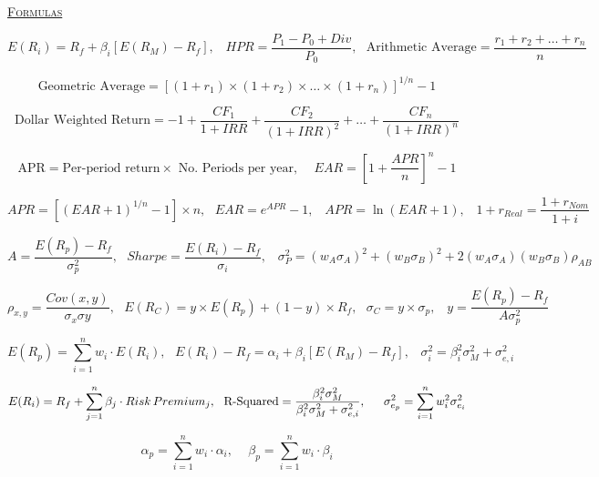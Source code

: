 \documentclass[addpoints, 12pt]{exam}%
\begin{document}
\begin{center}
	\LARGE
	\textsc{\ul{Formulas}}
\end{center}
\vspace{0.75cm}
$$E(R_{i}) = R_{f} + \beta_{i} \left[ E(R_{M}) - R_{f} \right], \,\,\,\,\, HPR = \frac{P_{1} - P_{0}+Div}{P_{0}}, \,\,\,\, \textrm{Arithmetic Average} = \frac{r_{1}+r_{2}+\dots +r_{n}}{n}$$

$$\textrm{Geometric Average} = \left[ (1+r_{1})\times (1+r_{2}) \times \dots \times (1+r_{n})\right]^{1/n}-1$$

$$\textrm{Dollar Weighted Return} = -1 + \frac{CF_{1}}{1+IRR} + \frac{CF_{2}}{(1+IRR)^{2}} + \dots + \frac{CF_{n}}{(1+IRR)^{n}} $$

$$\textrm{APR} = \textrm{Per-period return} \times \textrm{ No. Periods per year}, \,\,\,\,\,\,\, EAR = \left[ 1 + \frac{APR}{n}\right]^{n}-1$$

$$ APR = \left[ (EAR + 1)^{1/n} - 1 \right] \times n, \,\,\,\, EAR = e^{APR} - 1, \,\,\,\,\, APR = \ln (EAR + 1), \,\,\,\,\, 1+r_{Real} = \frac{1+r_{Nom}}{1+i}$$

$$ A = \frac{E(R_{p}) - R_{f}}{\sigma^{2}_{p}}, \,\,\,\, Sharpe = \frac{E(R_{i})-R_{f}}{\sigma_{i}}, \,\,\,\,\, \sigma^{2}_{P} = (w_{A}\sigma_{A})^{2} + (w_{B}\sigma_{B})^{2} + 2(w_{A}\sigma_{A})(w_{B}\sigma_{B})\rho_{AB}$$

$$\rho_{x,y} = \frac{Cov(x,y)}{\sigma_{x}\sigma{y}}, \,\,\,\, E(R_{C}) = y\times E(R_{p})+(1-y)\times R_{f}, \,\,\,\, \sigma_{C} = y \times \sigma_{p}, \,\,\,\,\, y =  \frac{E(R_{p}) - R_{f}}{A\sigma^{2}_{p}}$$

$$ E(R_{p}) = \sum_{i=1}^{n}w_{i}\cdot E(R_{i}), \,\,\,\,  E(R_{i}) - R_{f} =\alpha_{i} + \beta_{i}[E(R_{M})-R_{f}], \,\,\,\,\, \sigma^{2}_{i} = \beta^{2}_{i}\sigma^{2}_{M}+ \sigma^{2}_{e,i}$$

$$E(R_{i}) = R_{f} + \sum_{j=1}^{n}\beta_{j} \cdot Risk \, Premium_{j}, \,\,\,\, \textmd{R-Squared} = \frac{\beta^{2}_{i}\sigma^{2}_{M}}{\beta^{2}_{i}\sigma^{2}_{M}+ \sigma^{2}_{e,i}}, \,\,\,\,\,\,\,\,\, \sigma^{2}_{e_{p}} = \sum_{i=1}^{n}w^{2}_{i}\sigma^{2}_{e_{i}}$$

$$\alpha_{p} = \sum_{i=1}^{n} w_{i}\cdot \alpha_{i}, \,\,\,\,\,\,\, \beta_{p} = \sum_{i=1}^{n}w_{i}\cdot \beta_{i}$$

\vspace{1cm}
\begin{center}
	\gradetable[h][questions]
\end{center}

%
\end{document}
